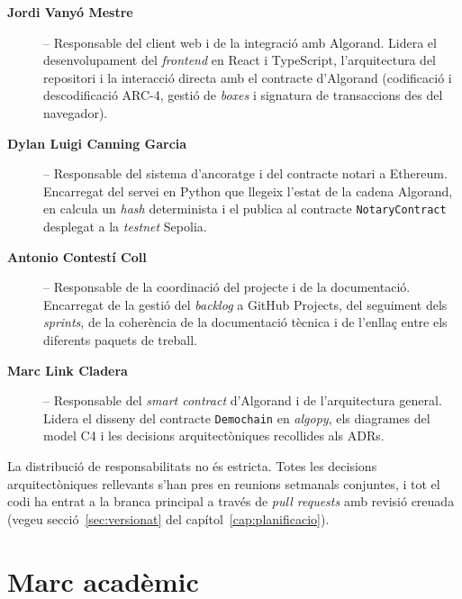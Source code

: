 \begin{description}
    \item[\textbf{Jordi Vanyó Mestre}] -- Responsable del client web i de la
    integració amb Algorand. Lidera el desenvolupament del \emph{frontend}
    en React i TypeScript, l'arquitectura del repositori i la interacció
    directa amb el contracte d'Algorand (codificació i descodificació
    ARC-4, gestió de \emph{boxes} i signatura de transaccions des del
    navegador).

    \item[\textbf{Dylan Luigi Canning Garcia}] -- Responsable del sistema
    d'ancoratge i del contracte notari a Ethereum. Encarregat del servei en
    Python que llegeix l'estat de la cadena Algorand, en calcula un
    \emph{hash} determinista i el publica al contracte
    \texttt{NotaryContract} desplegat a la \emph{testnet} Sepolia.

    \item[\textbf{Antonio Contestí Coll}] -- Responsable de la coordinació
    del projecte i de la documentació. Encarregat de la gestió del
    \emph{backlog} a GitHub Projects, del seguiment dels \emph{sprints},
    de la coherència de la documentació tècnica i de l'enllaç entre els
    diferents paquets de treball.

    \item[\textbf{Marc Link Cladera}] -- Responsable del \emph{smart
    contract} d'Algorand i de l'arquitectura general. Lidera el disseny
    del contracte \texttt{Demochain} en \emph{algopy}, els diagrames del
    model C4 \cite{brown2018c4} i les decisions arquitectòniques
    recollides als \acp{ADR}.
\end{description}

La distribució de responsabilitats no és estricta. Totes les decisions
arquitectòniques rellevants s'han pres en reunions setmanals conjuntes, i
tot el codi ha entrat a la branca principal a través de \emph{pull
requests} amb revisió creuada (vegeu secció~\ref{sec:versionat} del
capítol~\ref{cap:planificacio}).

\section{Marc acadèmic}
\label{sec:marc-academic}

